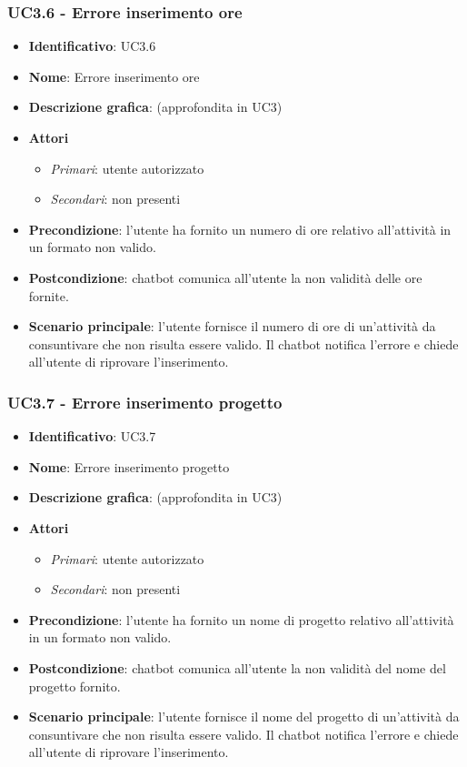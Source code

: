 \subsubsection{UC3.6 - Errore inserimento ore}
\begin{itemize}
    \item \textbf{Identificativo}: UC3.6
    \item \textbf{Nome}: Errore inserimento ore
    \item \textbf{Descrizione grafica}: (approfondita in UC3)
    \item \textbf{Attori}
        \begin{itemize} 
            \item \textit{Primari}: utente autorizzato
            \item \textit{Secondari}: non presenti
        \end{itemize}
    \item \textbf{Precondizione}: l'utente ha fornito un numero di ore relativo all'attività in un formato non valido. 
    \item \textbf{Postcondizione}: chatbot comunica all'utente la non validità delle ore fornite.
    \item \textbf{Scenario principale}: l'utente fornisce il numero di ore di un'attività da consuntivare che non risulta essere valido. Il chatbot notifica l'errore e chiede all'utente di riprovare l'inserimento. 
\end{itemize}
\newpage

\subsubsection{UC3.7 - Errore inserimento progetto}
\begin{itemize}
    \item \textbf{Identificativo}: UC3.7
    \item \textbf{Nome}: Errore inserimento progetto
    \item \textbf{Descrizione grafica}: (approfondita in UC3)
    \item \textbf{Attori}
        \begin{itemize} 
            \item \textit{Primari}: utente autorizzato
            \item \textit{Secondari}: non presenti
        \end{itemize}
    \item \textbf{Precondizione}: l'utente ha fornito un nome di progetto relativo all'attività in un formato non valido. 
    \item \textbf{Postcondizione}: chatbot comunica all'utente la non validità del nome del progetto fornito.
    \item \textbf{Scenario principale}: l'utente fornisce il nome del progetto di un'attività da consuntivare che non risulta essere valido. Il chatbot notifica l'errore e chiede all'utente di riprovare l'inserimento. 
\end{itemize}


